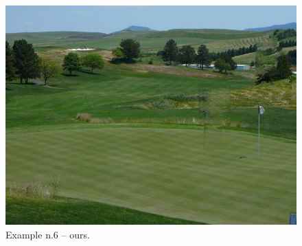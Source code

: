 \documentclass[a4paper, 11pt]{article}
\begin{document}
\begin{figure}
    \centering
    \includegraphics[width=.95\linewidth]{documentation/img/modified/0041.png}
    \caption{Example n.6 -- ours.}
    \label{img:ex_n.6_mask}
\end{figure}
\end{document}

